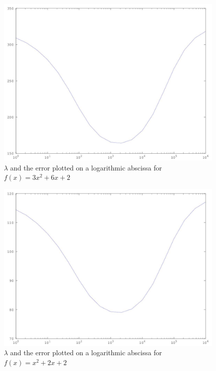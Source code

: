 \documentclass[12pt]{article}
\begin{document}
	\begin{figure}
		\centering
		\includegraphics[scale=0.5]{log}
		\caption{ $\lambda$ and the error plotted on a logarithmic abscissa for $f(x) = 3x^2 + 6x + 2$}
		\label{log_1}
	\end{figure}

	\begin{figure}
		\centering
		\includegraphics[scale=0.5]{log_small_f}
		\caption{ $\lambda$ and the error plotted on a logarithmic abscissa for $f(x) = x^2 + 2x + 2$}
		\label{log_2}
	\end{figure}
	
\end{document}
